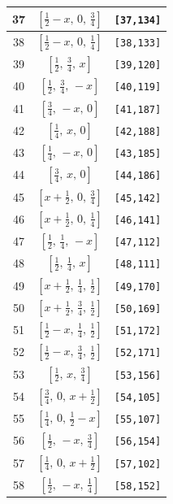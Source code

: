 \documentclass[fleqn,8pt]{jsarticle}
\begin{document}
\begin{longtable}{ccc}
37 & $\left[ \frac{1}{2} - x,\, 0,\, \frac{3}{4} \right]$ & {\tt [37,134]} \\ \hline
38 & $\left[ \frac{1}{2} - x,\, 0,\, \frac{1}{4} \right]$ & {\tt [38,133]} \\ \hline
39 & $\left[ \frac{1}{2},\, \frac{3}{4},\, x \right]$ & {\tt [39,120]} \\ \hline
40 & $\left[ \frac{1}{2},\, \frac{3}{4},\, - x \right]$ & {\tt [40,119]} \\ \hline
41 & $\left[ \frac{3}{4},\, - x,\, 0 \right]$ & {\tt [41,187]} \\ \hline
42 & $\left[ \frac{1}{4},\, x,\, 0 \right]$ & {\tt [42,188]} \\ \hline
43 & $\left[ \frac{1}{4},\, - x,\, 0 \right]$ & {\tt [43,185]} \\ \hline
44 & $\left[ \frac{3}{4},\, x,\, 0 \right]$ & {\tt [44,186]} \\ \hline
45 & $\left[ x + \frac{1}{2},\, 0,\, \frac{3}{4} \right]$ & {\tt [45,142]} \\ \hline
46 & $\left[ x + \frac{1}{2},\, 0,\, \frac{1}{4} \right]$ & {\tt [46,141]} \\ \hline
47 & $\left[ \frac{1}{2},\, \frac{1}{4},\, - x \right]$ & {\tt [47,112]} \\ \hline
48 & $\left[ \frac{1}{2},\, \frac{1}{4},\, x \right]$ & {\tt [48,111]} \\ \hline
49 & $\left[ x + \frac{1}{2},\, \frac{1}{4},\, \frac{1}{2} \right]$ & {\tt [49,170]} \\ \hline
50 & $\left[ x + \frac{1}{2},\, \frac{3}{4},\, \frac{1}{2} \right]$ & {\tt [50,169]} \\ \hline
51 & $\left[ \frac{1}{2} - x,\, \frac{1}{4},\, \frac{1}{2} \right]$ & {\tt [51,172]} \\ \hline
52 & $\left[ \frac{1}{2} - x,\, \frac{3}{4},\, \frac{1}{2} \right]$ & {\tt [52,171]} \\ \hline
53 & $\left[ \frac{1}{2},\, x,\, \frac{3}{4} \right]$ & {\tt [53,156]} \\ \hline
54 & $\left[ \frac{3}{4},\, 0,\, x + \frac{1}{2} \right]$ & {\tt [54,105]} \\ \hline
55 & $\left[ \frac{1}{4},\, 0,\, \frac{1}{2} - x \right]$ & {\tt [55,107]} \\ \hline
56 & $\left[ \frac{1}{2},\, - x,\, \frac{3}{4} \right]$ & {\tt [56,154]} \\ \hline
57 & $\left[ \frac{1}{4},\, 0,\, x + \frac{1}{2} \right]$ & {\tt [57,102]} \\ \hline
58 & $\left[ \frac{1}{2},\, - x,\, \frac{1}{4} \right]$ & {\tt [58,152]} \\ \hline

\end{longtable}
\end{document}
